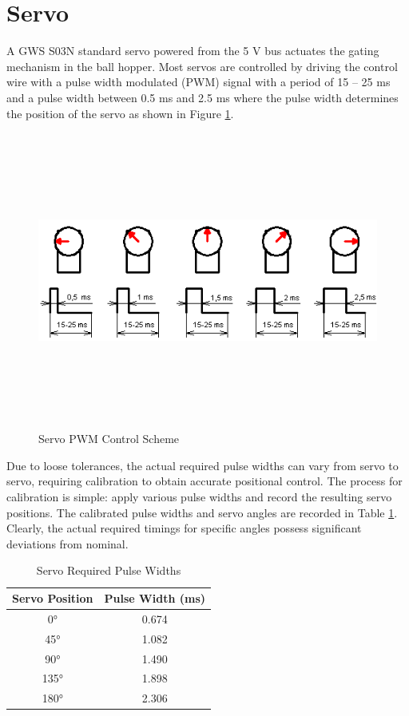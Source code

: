 \section{Servo}
A GWS S03N standard servo powered from the 5 V bus actuates the gating mechanism in the ball hopper. Most servos are controlled by driving the control wire with a pulse width modulated (PWM) signal with a period of 15 -- 25 ms and a pulse width between 0.5 ms and 2.5 ms where the pulse width determines the position of the servo as shown in Figure \ref{fig:servo_pulse_width}. 
\begin{figure}[H]   %
	\centering \includegraphics[width=6in, height=3.85in, keepaspectratio]{figures/servo_pulse_width.png}
	\caption{Servo PWM Control Scheme \cite{servo_pulse_width}}\label{fig:servo_pulse_width}
\end{figure}
Due to loose tolerances, the actual required pulse widths can vary from servo to servo, requiring calibration to obtain accurate positional control. The process for calibration is simple: apply various pulse widths and record the resulting servo positions. The calibrated pulse widths and servo angles are recorded in Table \ref{tab:servo_angles}. Clearly, the actual required timings for specific angles possess significant deviations from nominal. 
\begin{table}[h]
	\centering \caption{Servo Required Pulse Widths}	\label{tab:servo_angles}
	\begin{tabular}{cc}
		\toprule 
		Servo Position & Pulse Width (ms) \\ 
		\midrule 
		\ang{0} & 0.674 \\ 
		\ang{45} & 1.082 \\
		\ang{90} & 1.490 \\ 
		\ang{135} & 1.898 \\ 
		\ang{180} & 2.306 \\ 
		\bottomrule 
	\end{tabular} 
\end{table}

